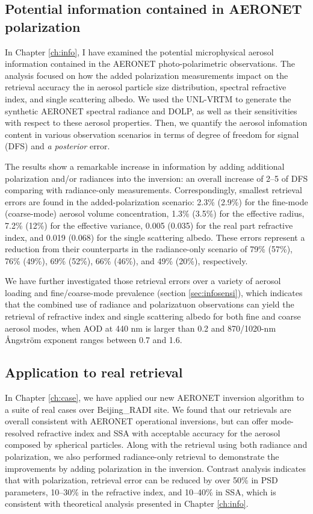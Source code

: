 \subsection{Potential information contained in AERONET polarization}

In Chapter \ref{ch:info}, I have examined the potential microphysical aerosol
information contained in the AERONET photo-polarimetric observations. The
analysis focused on how the added polarization measurements impact on the
retrieval accuracy the in aerosol particle size distribution, spectral
refractive index, and single scattering albedo. We used the UNL-VRTM to generate
the synthetic AERONET spectral radiance and DOLP, as well as their
sensitivities with respect to these aerosol properties. Then, we quantify the
aerosol infomation content in various observation scenarios in terms of degree
of freedom for signal (DFS) and \textit{a posterior} error.

The results show a remarkable increase in information by adding additional
polarization and/or radiances into the inversion: an overall increase of 2--5
of DFS comparing with radiance-only measurements. Correspondingly, smallest
retrieval errors are found in the added-polarization scenario: 2.3\% (2.9\%) 
for the fine-mode (coarse-mode) aerosol volume concentration, 1.3\% (3.5\%) 
for the effective radius, 7.2\% (12\%) for the effective variance, 
0.005 (0.035) for the real part refractive index, and 0.019 (0.068) for 
the single scattering albedo. These errors represent a reduction from their 
counterparts in the radiance-only scenario of 79\% (57\%), 76\% (49\%), 
69\% (52\%), 66\% (46\%), and 49\% (20\%), respectively. 

We have further investigated those retrieval errors over a variety of 
aerosol loading and fine/coarse-mode prevalence (section \ref{sec:infosensi}),
which indicates that the combined use of radiance
and polarizatuon observations can yield the retrieval of refractive index 
and single scattering albedo for both fine and coarse aerosol modes, 
when AOD at 440 nm is larger than 0.2 and
870/1020-nm Ångström exponent ranges between 0.7 and 1.6. 

\subsection{Application to real retrieval}

In Chapter \ref{ch:case}, we have applied our new AERONET inversion algorithm 
to a suite of real cases over Beijing\_RADI site. We 
found that our retrievals are overall consistent with AERONET operational
inversions, but can offer mode-resolved refractive index and SSA with
acceptable accuracy for the aerosol composed by spherical particles. Along with
the retrieval using both radiance and polarization, we also performed
radiance-only retrieval to demonstrate the improvements by adding polarization
in the inversion. Contrast analysis indicates that with polarization, retrieval
error can be reduced by over 50\% in PSD parameters, 10--30\% in the refractive
index, and 10--40\% in SSA, which is consistent with theoretical analysis
presented in Chapter \ref{ch:info}.

